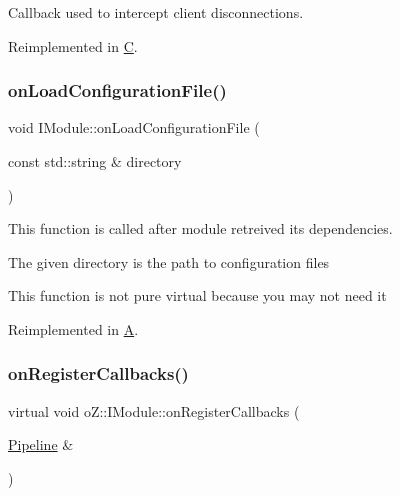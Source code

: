 Callback used to intercept client disconnections. 



Reimplemented in \mbox{\hyperlink{class_c_ab9bef2875c2d19d674aa592f63a21bc1}{C}}.

\mbox{\label{classo_z_1_1_i_module_a61a2cc76594401ed2f50931a6a6b76f3}} 
\subsubsection{\texorpdfstring{onLoadConfigurationFile()}{onLoadConfigurationFile()}}
{\footnotesize\ttfamily void I\+Module\+::on\+Load\+Configuration\+File (\begin{DoxyParamCaption}\item[{const std\+::string \&}]{directory }\end{DoxyParamCaption})\hspace{0.3cm}{\ttfamily [virtual]}}



This function is called after module retreived its dependencies. 

The given directory is the path to configuration files

This function is not pure virtual because you may not need it 

Reimplemented in \mbox{\hyperlink{class_a_aa096a581a39df500ec97e2d48c24fbef}{A}}.

\mbox{\label{classo_z_1_1_i_module_a3dc905faa6df5e22eecc6ffbc923fd95}} 
\subsubsection{\texorpdfstring{onRegisterCallbacks()}{onRegisterCallbacks()}}
{\footnotesize\ttfamily virtual void o\+Z\+::\+I\+Module\+::on\+Register\+Callbacks (\begin{DoxyParamCaption}\item[{\mbox{\hyperlink{classo_z_1_1_pipeline}{Pipeline}} \&}]{ }\end{DoxyParamCaption})\hspace{0.3cm}{\ttfamily [pure virtual]}}



